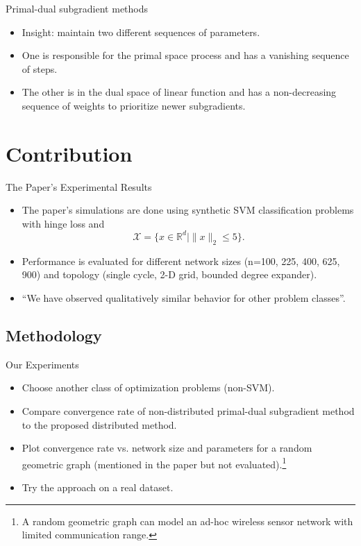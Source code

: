 \documentclass{beamer}
\begin{document}
	\begin{frame}{Primal-dual subgradient methods}
		\begin{itemize}
			\item Insight: maintain two different sequences of parameters.
			\item One is responsible for the primal space process and has a vanishing sequence of steps.
			\item The other is in the dual space of linear function and has a non-decreasing sequence of 
				weights to prioritize newer subgradients.
		\end{itemize}
	\end{frame}	
	
	\section{Contribution}
	\begin{frame}{The Paper's Experimental Results}
		\begin{itemize}
			\item	The paper's simulations are done using
				synthetic SVM classification problems with hinge loss and
				\[\mathcal{X} = \{x \in \mathbb{R}^d \mid \|x\|_2 \leq 5\}.\]
			\item Performance is evaluated for different network sizes (n=100, 225, 400, 625, 900)
				and topology (single cycle, 2-D grid, bounded degree expander).
			\item ``We have observed qualitatively similar behavior for other problem classes''.
		\end{itemize}
	\end{frame}
	
	\subsection{Methodology}
	\begin{frame}{Our Experiments}
		\begin{itemize}
			\item Choose another class of optimization problems (non-SVM).
			\item Compare convergence rate of non-distributed primal-dual subgradient method
				to the proposed distributed method.
			\item Plot convergence rate vs. network size and parameters for a random geometric
				graph (mentioned in the paper but not evaluated).\footnote{A random geometric
				graph can model an ad-hoc wireless sensor network with limited communication range.}
			\item Try the approach on a real dataset.				
		\end{itemize}
	\end{frame}
	
\end{document}
